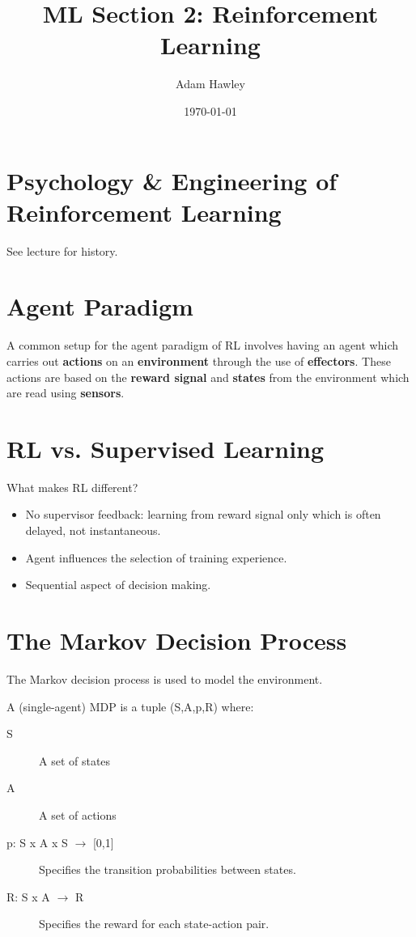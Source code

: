 \documentclass[11pt]{article}
\author{Adam Hawley}
\date{\today}
\title{ML Section 2: Reinforcement Learning}
\begin{document}
\maketitle
\tableofcontents


\section{Psychology \& Engineering of Reinforcement Learning}
\label{sec:orga1c31ec}
See lecture for history.

\section{Agent Paradigm}
\label{sec:org3e4211e}
A common setup for the agent paradigm of RL involves having an agent which carries out \textbf{actions} on an \textbf{environment} through the use of \textbf{effectors}.
These actions are based on the \textbf{reward signal} and \textbf{states} from the environment which are read using \textbf{sensors}.

\section{RL vs. Supervised Learning}
\label{sec:org57ef0bc}
What makes RL different?
\begin{itemize}
\item No supervisor feedback: learning from reward signal only which is often delayed, not instantaneous.
\item Agent influences the selection of training experience.
\item Sequential aspect of decision making.
\end{itemize}

\section{The Markov Decision Process}
\label{sec:org62007d6}
The Markov decision process is used to model the environment.

A (single-agent) MDP is a tuple (S,A,p,R) where:
\begin{description}
\item[{S}] A set of states
\item[{A}] A set of actions
\item[{p: S x A x S \(\rightarrow\) [0,1]}] Specifies the transition probabilities between states.
\item[{R: S x A \(\rightarrow\) R}] Specifies the reward for each state-action pair.
\end{description}
\end{document}
